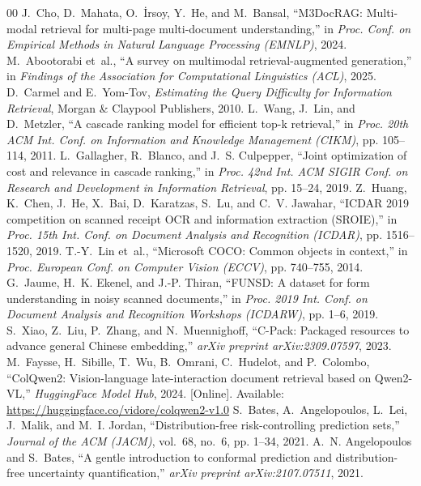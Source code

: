 \documentclass[conference]{IEEEtran}
\begin{document}
\begin{thebibliography}{00}
J.~Cho, D.~Mahata, O.~{\.I}rsoy, Y.~He, and M.~Bansal, ``M3DocRAG: Multi-modal retrieval for multi-page multi-document understanding,'' in \emph{Proc. Conf. on Empirical Methods in Natural Language Processing (EMNLP)}, 2024.
M.~Abootorabi et~al., ``A survey on multimodal retrieval-augmented generation,'' in \emph{Findings of the Association for Computational Linguistics (ACL)}, 2025.
D.~Carmel and E.~Yom-Tov, \emph{Estimating the Query Difficulty for Information Retrieval}, Morgan \& Claypool Publishers, 2010.
L.~Wang, J.~Lin, and D.~Metzler, ``A cascade ranking model for efficient top-k retrieval,'' in \emph{Proc. 20th ACM Int. Conf. on Information and Knowledge Management (CIKM)}, pp. 105--114, 2011.
L.~Gallagher, R.~Blanco, and J.~S. Culpepper, ``Joint optimization of cost and relevance in cascade ranking,'' in \emph{Proc. 42nd Int. ACM SIGIR Conf. on Research and Development in Information Retrieval}, pp. 15--24, 2019.
Z.~Huang, K.~Chen, J.~He, X.~Bai, D.~Karatzas, S.~Lu, and C.~V. Jawahar, ``ICDAR 2019 competition on scanned receipt OCR and information extraction (SROIE),'' in \emph{Proc. 15th Int. Conf. on Document Analysis and Recognition (ICDAR)}, pp. 1516--1520, 2019.
T.-Y.~Lin et~al., ``Microsoft COCO: Common objects in context,'' in \emph{Proc. European Conf. on Computer Vision (ECCV)}, pp. 740--755, 2014.
G.~Jaume, H.~K. Ekenel, and J.-P. Thiran, ``FUNSD: A dataset for form understanding in noisy scanned documents,'' in \emph{Proc. 2019 Int. Conf. on Document Analysis and Recognition Workshops (ICDARW)}, pp. 1--6, 2019.
S.~Xiao, Z.~Liu, P.~Zhang, and N.~Muennighoff, ``C-Pack: Packaged resources to advance general Chinese embedding,'' \emph{arXiv preprint arXiv:2309.07597}, 2023.
M.~Faysse, H.~Sibille, T.~Wu, B.~Omrani, C.~Hudelot, and P.~Colombo, ``ColQwen2: Vision-language late-interaction document retrieval based on Qwen2-VL,'' \emph{HuggingFace Model Hub}, 2024. [Online]. Available: \url{https://huggingface.co/vidore/colqwen2-v1.0}
S.~Bates, A.~Angelopoulos, L.~Lei, J.~Malik, and M.~I. Jordan, ``Distribution-free risk-controlling prediction sets,'' \emph{Journal of the ACM (JACM)}, vol.~68, no.~6, pp. 1--34, 2021.
A.~N. Angelopoulos and S.~Bates, ``A gentle introduction to conformal prediction and distribution-free uncertainty quantification,'' \emph{arXiv preprint arXiv:2107.07511}, 2021.

\end{thebibliography}
\end{document}
